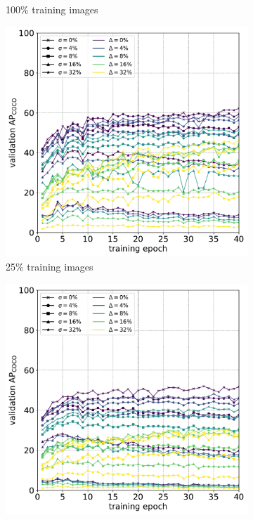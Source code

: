 \documentclass[conference]{IEEEtran}
\begin{document}
\begin{figure}[ht]
\begin{subfigure}[t]{0.5\linewidth}
  \caption{100\% training images}
\end{subfigure}
\begin{subfigure}[t]{0.5\linewidth}
  \includegraphics[width=1.0\linewidth]{figures/noise_4_training.pdf}
  \caption{25\% training images}
\end{subfigure}%
\begin{subfigure}[t]{0.5\linewidth}
  \includegraphics[width=1.0\linewidth]{figures/noise_16_training.pdf}

\end{subfigure}
\end{figure}
\end{document}

